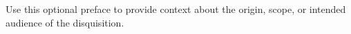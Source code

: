 
Use this optional preface to provide context about the origin, scope, or intended audience of the disquisition.

\clearpage